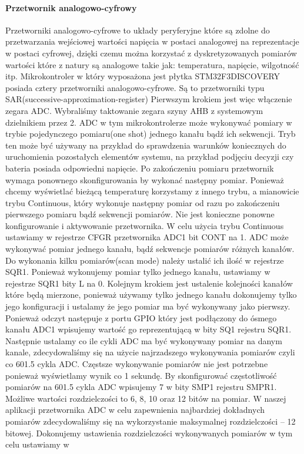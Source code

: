\documentclass{article}
\begin{document}
\paragraph{Przetwornik analogowo-cyfrowy}
Przetworniki analogowo-cyfrowe to układy peryferyjne które są
zdolne do przetwarzania wejściowej wartości napięcia w postaci analogowej
na reprezentacje w postaci cyfrowej, dzięki czemu można korzystać z dyskretyzowanych pomiarów
wartości które z natury są analogowe takie jak: temperatura, napięcie, wilgotność itp.
Mikrokontroler w który wyposażona jest płytka STM32F3DISCOVERY posiada cztery
przetworniki analogowo-cyfrowe. Są to przetworniki typu SAR(successive-approximation-register)
Pierwszym krokiem jest więc włączenie zegara ADC. Wybraliśmy taktowanie zegara szyny
AHB z systemowym dzielnikiem przez 2.
ADC w tym mikrokontrolerze może wykonywać pomiary w trybie pojedynczego pomiaru(one
shot) jednego kanału bądź ich sekwencji. Tryb ten może być używany na przykład do sprawdzenia
warunków koniecznych do uruchomienia pozostałych elementów systemu, na przykład podjęciu decyzji
czy bateria posiada odpowiedni napięcie. Po zakończeniu pomiaru przetwornik wymaga ponownego
skonfigurowania by wykonać następny pomiar.
Ponieważ chcemy wyświetlać bieżącą temperaturę korzystamy z innego trybu, a mianowicie
trybu Continuous, który wykonuje następny pomiar od razu po zakończeniu pierwszego pomiaru bądź
sekwencji pomiarów. Nie jest konieczne ponowne konfigurowanie i aktywowanie przetwornika. W celu
użycia trybu Continuous ustawiamy w rejestrze CFGR przetwornika ADC1
bit CONT na 1.
ADC może wykonywać pomiar jednego kanału, bądź sekwencje pomiarów różnych kanałów.
Do wykonania kilku pomiarów(scan mode) należy ustalić ich ilość w rejestrze SQR1.
Ponieważ wykonujemy pomiar tylko jednego kanału, ustawiamy w rejestrze SQR1 bity L na 0.
Kolejnym krokiem jest ustalenie kolejności kanałów które będą mierzone, ponieważ używamy
tylko jednego kanału dokonujemy tylko jego konfiguracji i ustalamy że jego pomiar ma być wykonywany
jako pierwszy. Ponieważ odczyt następuje z portu GPIO który jest podłączony do ósmego kanału ADC1
wpisujemy wartość go reprezentującą w bity SQ1 rejestru SQR1.
Następnie ustalamy co ile cykli ADC ma być wykonywany pomiar na danym kanale,
zdecydowaliśmy się na użycie najrzadszego wykonywania pomiarów czyli co 601.5 cykla ADC. Częstsze
wykonywanie pomiarów nie jest potrzebne ponieważ wyświetlamy wynik co 1 sekundę.
By skonfigurować częstotliwość pomiarów na 601.5 cykla ADC wpisujemy 7 w bity SMP1 rejestru
SMPR1.
Możliwe wartości rozdzielczości to 6, 8, 10 oraz 12 bitów na pomiar. W naszej aplikacji
przetwornika ADC w celu zapewnienia najbardziej dokładnych pomiarów zdecydowaliśmy się na
wykorzystanie maksymalnej rozdzielczości – 12 bitowej.
Dokonujemy ustawienia rozdzielczości wykonywanych pomiarów w tym celu ustawiamy w
\end{document}
